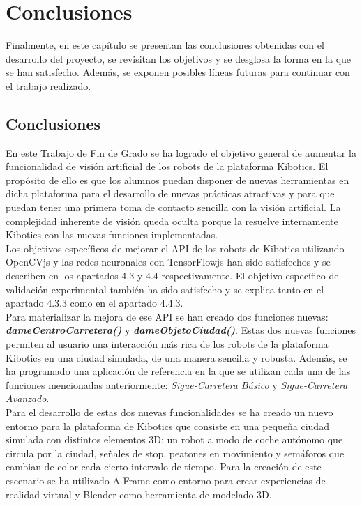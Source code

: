 \documentclass{report}
\begin{document}
\chapter{Conclusiones}
Finalmente, en este capítulo se presentan las conclusiones obtenidas con el desarrollo del proyecto, se revisitan los objetivos y se desglosa la forma en la que se han satisfecho. Además, se exponen posibles líneas futuras para continuar con el trabajo realizado.

\section{Conclusiones}
En este Trabajo de Fin de Grado se ha logrado el objetivo general de aumentar la funcionalidad de visión artificial de los robots de la plataforma Kibotics. El propósito de ello es que los alumnos puedan disponer de nuevas herramientas en dicha plataforma para el desarrollo de nuevas prácticas atractivas y para que puedan tener una primera toma de contacto sencilla con la visión artificial. La complejidad inherente de visión queda oculta porque la resuelve internamente Kibotics con las nuevas funciones implementadas.
\\

Los objetivos específicos de mejorar el API de los robots de Kibotics utilizando OpenCVjs y las redes neuronales con TensorFlowjs han sido satisfechos y se describen en los apartados 4.3 y 4.4 respectivamente. El objetivo específico de validación experimental también ha sido satisfecho y se explica tanto en el apartado 4.3.3 como en el apartado 4.4.3. 
\\

Para materializar la mejora de ese API se han creado dos funciones nuevas: \textit{\textbf{dameCentroCarretera()}} y \textit{\textbf{dameObjetoCiudad()}}. Estas dos nuevas funciones permiten al usuario una interacción más rica de los robots de la plataforma Kibotics en una ciudad simulada, de una manera sencilla y robusta. Además, se ha programado una aplicación de referencia en la que se utilizan cada una de las funciones mencionadas anteriormente: \textit{Sigue-Carretera Básico} y \textit{Sigue-Carretera Avanzado}.
\\

Para el desarrollo de estas dos nuevas funcionalidades se ha creado un nuevo entorno para la plataforma de Kibotics que consiste en una pequeña ciudad simulada con distintos elementos 3D: un robot a modo de coche autónomo que circula por la ciudad, señales de stop, peatones en movimiento y semáforos que cambian de color cada cierto intervalo de tiempo. Para la creación de este escenario se ha utilizado A-Frame como entorno para crear experiencias de realidad virtual y Blender como herramienta de modelado 3D.
\\
\end{document}

